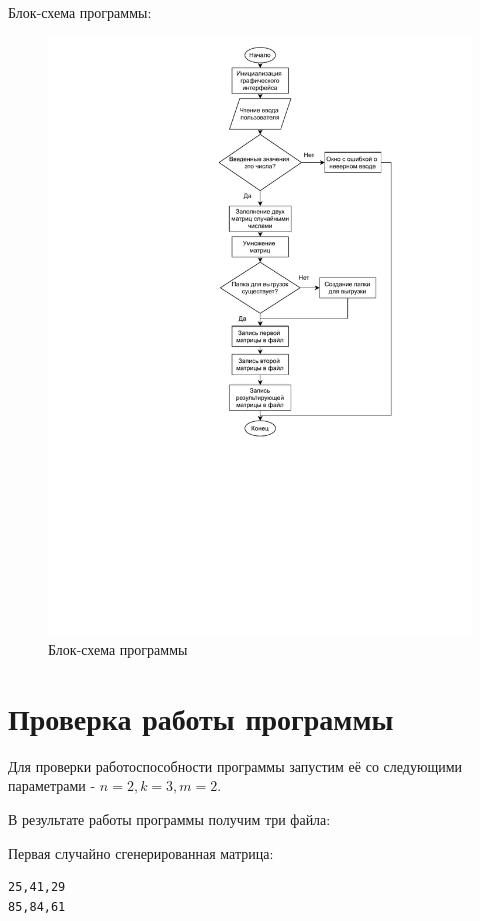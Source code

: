 \documentclass[a4paper,14pt]{extarticle}
\begin{document}
Блок-схема программы:
\begin{figure}
	\includegraphics[width=\textwidth]{include/exported_diag.pdf}
	\caption{Блок-схема программы}
\end{figure}

\section{Проверка работы программы}
Для проверки работоспособности программы запустим её со следующими параметрами - 
$n = 2, k = 3, m = 2$.

В результате работы программы получим три файла:

Первая случайно сгенерированная матрица:
\begin{verbatim}
25,41,29
85,84,61
\end{verbatim}
\end{document}
